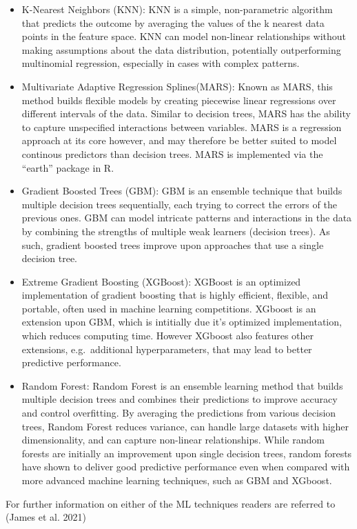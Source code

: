 \documentclass[
]{article}
\begin{document}
\begin{itemize}
\item
  K-Nearest Neighbors (KNN):
  KNN is a simple, non-parametric algorithm that predicts the outcome by averaging the values of the k nearest data points in the feature space.
  KNN can model non-linear relationships without making assumptions about the data distribution, potentially outperforming multinomial regression, especially in cases with complex patterns.
\item
  Multivariate Adaptive Regression Splines(MARS):
  Known as MARS, this method builds flexible models by creating piecewise linear regressions over different intervals of the data. Similar to decision trees, MARS has the ability to capture unspecified interactions between variables. MARS is a regression approach at its core however, and may therefore be better suited to model continous predictors than decision trees. MARS is implemented via the ``earth'' package in R.
\item
  Gradient Boosted Trees (GBM):
  GBM is an ensemble technique that builds multiple decision trees sequentially, each trying to correct the errors of the previous ones.
  GBM can model intricate patterns and interactions in the data by combining the strengths of multiple weak learners (decision trees). As such, gradient boosted trees improve upon approaches that use a single decision tree.
\item
  Extreme Gradient Boosting (XGBoost):
  XGBoost is an optimized implementation of gradient boosting that is highly efficient, flexible, and portable, often used in machine learning competitions. XGboost is an extension upon GBM, which is intitially due it's optimized implementation, which reduces computing time. However XGboost also features other extensions, e.g.~additional hyperparameters, that may lead to better predictive performance.
\item
  Random Forest:
  Random Forest is an ensemble learning method that builds multiple decision trees and combines their predictions to improve accuracy and control overfitting.
  By averaging the predictions from various decision trees, Random Forest reduces variance, can handle large datasets with higher dimensionality, and can capture non-linear relationships. While random forests are initially an improvement upon single decision trees, random forests have shown to deliver good predictive performance even when compared with more advanced machine learning techniques, such as GBM and XGboost.
\end{itemize}

For further information on either of the ML techniques readers are referred to (James et al. 2021)
\end{document}
